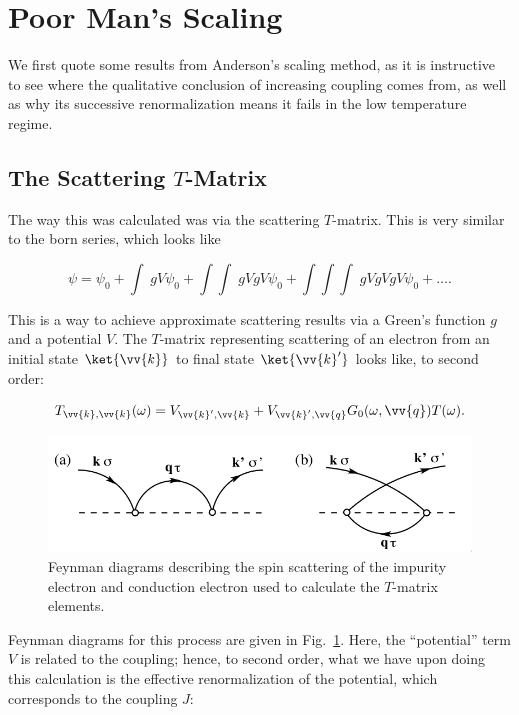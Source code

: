\section{Poor Man's Scaling}

We first quote some results from Anderson's scaling method, as it is instructive to see where the qualitative conclusion of increasing coupling comes from, as well as why its successive renormalization means it fails in the low temperature regime.


\subsection{The Scattering \texorpdfstring{$T$}{T}-Matrix}

The way this was calculated was via the scattering $T$-matrix. This is very similar to the born series, which looks like

\begin{equation}
  \psi = \psi_0 + \int\; gV\psi_0 + \int\int\; gVgV\psi_0 + \int\int\int\; gVgVgV\psi_0 + \ldots.
\end{equation}

This is a way to achieve approximate scattering results via a Green's function $g$ and a potential $V$. The $T$-matrix representing scattering of an electron from an initial state $\ket{\vv{k}}$ to final state $\ket{\vv{k}'}$ looks like, to second order:

\begin{equation}
  T_{\vv{k},\vv{k}}(\omega) = V_{\vv{k}',\vv{k}} + V_{\vv{k}',\vv{q}} G_0(\omega, \vv{q})T(\omega).
\end{equation}

\begin{figure}
  \centering
  \includegraphics[width=0.6\linewidth]{./gfx/poormans-feynman.png}
  \caption{Feynman diagrams describing the spin scattering of the impurity electron and conduction electron used to calculate the $T$-matrix elements.}
  \label{fig:2-poormans-diagrams}
\end{figure}

Feynman diagrams for this process are given in Fig.~\ref{fig:2-poormans-diagrams}. Here, the ``potential'' term $V$ is related to the coupling; hence, to second order, what we have upon doing this calculation is the effective renormalization of the potential, which corresponds to the coupling $J$:


